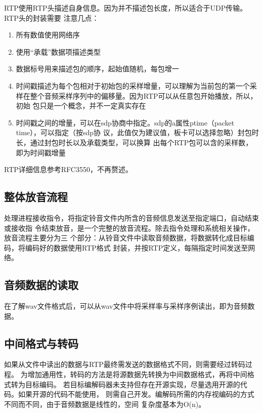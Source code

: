 \documentclass[11pt]{article}
\begin{document}
    RTP使用RTP头描述自身信息。因为并不描述包长度，所以适合于UDP传输。RTP头的封装需要
注意几点：
\begin{enumerate}
    \item 所有数值使用网络序
    \item 使用“承载”数据项描述类型
    \item 数据标号用来描述包的顺序，起始值随机，每包增一
    \item 时间戳描述为每个包相对于初始包的采样增量，可以理解为当前包的第一个采
        样在整个音频采样序列中的偏移量。因为RTP可以从任意包开始播放，所以，初始
        包只是一个概念，并不一定真实存在
    \item 时间戳之间的增量，可以在sdp协商中指定。sdp的a属性ptime（packet time），可以指定（按sdp协
        议，此值仅为建议值，板卡可以选择忽略）封包时长，通过封包时长以及承载类型，可以换算
        出每个RTP包可以含的采样数，即为时间戳增量
\end{enumerate}

   RTP详细信息参考RFC3550，不再赘述。

\subsection{整体放音流程}
    处理进程接收指令，将指定铃音文件内所含的音频信息发送至指定端口，自动结束或接收指
令结束放音，是一个完整的放音流程。除去指令处理和系统相关操作，放音流程主要分为三
个部分：从铃音文件中读取音频数据，将数据转化成目标编码，将编码好的数据使用RTP格式
封装，并按RTP定义，每隔指定时间发送至网络。
\subsection{音频数据的读取}
    在了解wav文件格式后，可以从wav文件中将采样率与采样序例读出，即为音频数据。
\subsection{中间格式与转码}
    如果从文件中读出的数据与RTP最终需发送的数据格式不同，则需要经过转码过程。
为增加通用性，转码的方法是将源数据先转换为中间数据格式，再将中间格式转为目标编码。
若目标编解码器未支持但存在开源实现，尽量选用开源的代码。如果开源的代码不能使用，
则需自己开发。编解码所需的内存视编码的方式不同而不同，由于音频数据是线性的，空间
复杂度基本为O(n)。
\end{document}
